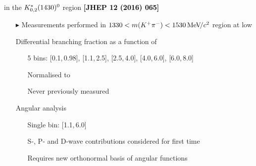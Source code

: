 \documentclass[aspectratio=1610]{beamer}
\def\Kstarfourteenthirty  {{\ensuremath{\kaon^{*}_{0,2}(1430)^{0}}}\xspace}
\begin{document}
\begin{frame}{\BdToKpimm in the \Kstarfourteenthirty region \hspace{0pt plus 1 filll} {\small \bf \textcolor{black}{[JHEP 12 (2016) 065]}}}
\begin{itemize}
\item[$\blacktriangleright$] Measurements performed in $1330<m({{K}^+}{{\pi}^-})<1530{\mathrm{\,Me\kern -0.1em V\!/}c^2}$ region at low \qsq
\item[]
\item[\ding{182}] Differential branching fraction as a function of \qsq
  \begin{itemize}
    \item[\ding{70}] 5 \qsq bins: [0.1,\,0.98], [1.1,\,2.5], [2.5,\,4.0], [4.0,\,6.0], [6.0,\,8.0]~\gevgevcccc
    \item[\ding{70}] Normalised to \BdToJPsiKstP
    \item[\ding{70}] Never previously measured
  \end{itemize}
\item[\ding{183}] Angular analysis
  \begin{itemize}
    \item[\ding{70}] Single \qsq bin: [1.1,\,6.0]~\gevgevcccc
    \item[\ding{70}] S-, P- and D-wave contributions considered for first time
    \item[\ding{70}] Requires new orthonormal basis of angular functions 
  \end{itemize}
  
\end{itemize}
\end{frame}
\end{document}
